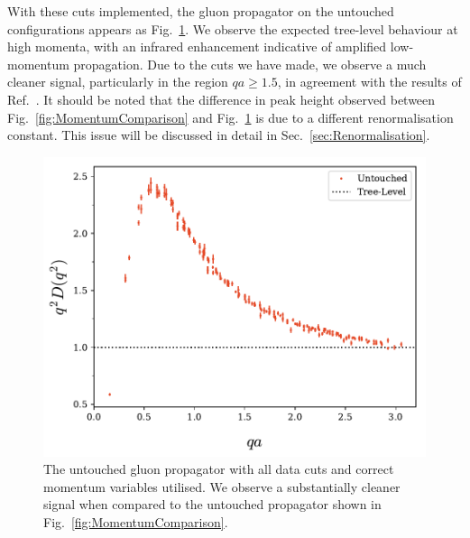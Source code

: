 With these cuts implemented, the gluon propagator on the untouched configurations appears as Fig.~\ref{fig:UntouchedPropagator}. We observe the expected tree-level behaviour at high momenta, with an infrared enhancement indicative of amplified low-momentum propagation. Due to the cuts we have made, we observe a much cleaner signal, particularly in the region $qa\geq 1.5$, in agreement with the results of Ref.~\cite{Bonnet:2001uh}. It should be noted that the difference in peak height observed between Fig.~\ref{fig:MomentumComparison} and Fig.~\ref{fig:UntouchedPropagator} is due to a different renormalisation constant. This issue will be discussed in detail in Sec.~\ref{sec:Renormalisation}.
%
\begin{figure}[htb!]
\centering
\includegraphics[width=\linewidth]{./ScalarGluComp_q2_NoCoolU.pdf}
\caption{\label{fig:UntouchedPropagator} The untouched gluon propagator with all data cuts and correct momentum variables utilised. We observe a substantially cleaner signal when compared to the untouched propagator shown in Fig.~\ref{fig:MomentumComparison}.}
\end{figure}



